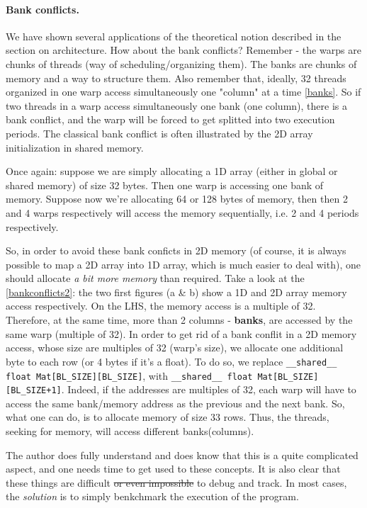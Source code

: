 \documentclass[12pt]{article}
\begin{document}
\paragraph{Bank conflicts.} We have shown several applications of the theoretical notion described in the section 
on architecture. How about the bank conflicts? Remember - the warps are chunks of threads (way of scheduling/organizing them). 
The banks are chunks of memory and a way to structure them. Also remember that, ideally, 32 threads 
organized in one warp access simultaneously one "column" at a time \autoref{banks}. So if two threads in a warp access simultaneously 
one bank (one column), there is a bank conflict, and the warp will be forced to get splitted into two execution periods. 
The classical bank conflict is often illustrated by the 2D array initialization in shared memory. 

Once again: suppose we are simply allocating a 1D array (either in global or shared memory) of size 32 bytes. Then one warp is accessing one bank of memory. 
Suppose now we're allocating 64 or 128 bytes of memory, then then 2 and 4 warps  respectively will access the memory sequentially, i.e. 2 and 4 periods respectively.

So, in order to avoid these bank conficts in 2D memory (of course, it is always possible to map a 2D array into 1D array, which is much easier to deal with), one should allocate 
\textit{a bit more memory} than required. Take a look at the \autoref{bankconflicts2}: the two first figures (a \& b) show a 1D and 2D array memory access respectively. 
On the LHS, the memory access is a multiple of 32. Therefore, at the same time, more than 2 columns - \textbf{banks}, are accessed by the same warp (multiple of 32). 
In order to get rid of a bank conflit in a 2D memory access, whose size are multiples of 32 (warp's size), we allocate one additional byte to each row (or 4 bytes if it's a float).
To do so, we replace \verb|__shared__ float Mat[BL_SIZE][BL_SIZE]|, with \verb|__shared__ float Mat[BL_SIZE][BL_SIZE+1]|. Indeed, if the addresses are multiples of 32, each warp will 
have to access the same bank/memory address as the previous and the next bank. So, what one can do, is to allocate memory of size 33 rows. Thus, the threads, seeking for memory, will 
access different banks(columns).

The author does fully understand and does know that this is a quite complicated aspect, and one needs time to get used 
to these concepts. It is also clear that these things are difficult \sout{or even impossible} to debug and track. In most cases, 
the \textit{solution} is to simply benkchmark the execution of the program. 
\end{document}
